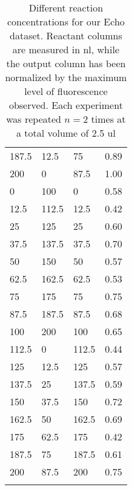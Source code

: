 \begin{longtable}{lll | l}
187.5    & 12.5  & 75    & 0.89 \\
200      & 0     & 87.5  & 1.00 \\
0        & 100   & 0     & 0.58 \\
12.5     & 112.5 & 12.5  & 0.42 \\
25       & 125   & 25    & 0.60 \\
37.5     & 137.5 & 37.5  & 0.70 \\
50       & 150   & 50    & 0.57 \\
62.5     & 162.5 & 62.5  & 0.53 \\
75       & 175   & 75    & 0.75 \\
87.5     & 187.5 & 87.5  & 0.68 \\
100      & 200   & 100   & 0.65 \\
112.5    & 0     & 112.5 & 0.44 \\
125      & 12.5  & 125   & 0.57 \\
137.5    & 25    & 137.5 & 0.59 \\
150      & 37.5  & 150   & 0.72 \\
162.5    & 50    & 162.5 & 0.69 \\
175      & 62.5  & 175   & 0.42 \\
187.5    & 75    & 187.5 & 0.61 \\
200      & 87.5  & 200   & 0.75 \\
\caption[Different reaction concentrations for our Echo dataset]{Different reaction concentrations for our Echo dataset.
Reactant columns are measured in \gls{nl}, while the output column has been normalized by the maximum level of fluorescence observed.
Each experiment was repeated $n = 2$ times at a total volume of 2.5 \gls{ul}}
\label{tab:echo}
\end{longtable}